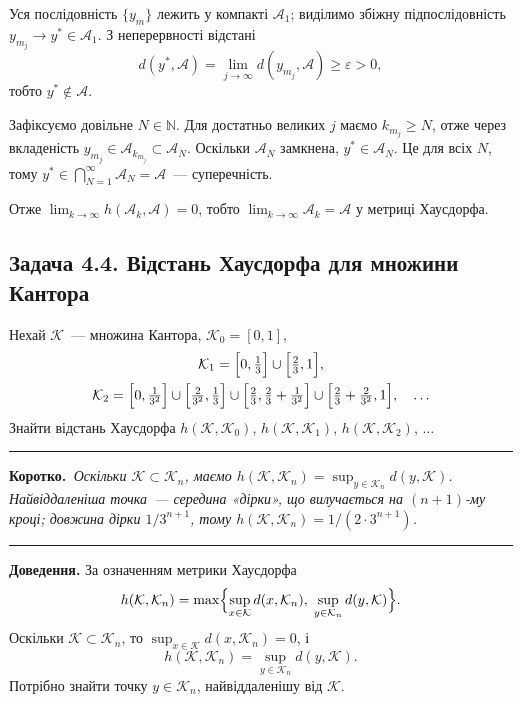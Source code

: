\documentclass[12pt,a4paper]{article}
\newenvironment{korotko}
  {\par\medskip\noindent\begingroup\color{accent!75!black}\rule{\linewidth}{0.4pt}\par
   \noindent\textbf{Коротко.}\itshape\,}
  {\par\noindent\rule{\linewidth}{0.4pt}\endgroup\medskip}
\begin{document}
Уся послідовність $\{y_m\}$ лежить у компакті $\mathcal{A}_1$; виділимо збіжну
підпослідовність $y_{m_j}\to y^*\in\mathcal{A}_1$. З неперервності відстані
\begin{equation*}
  d(y^*,\mathcal{A})=\lim_{j\to\infty}d(y_{m_j},\mathcal{A})\ge\varepsilon>0,
\end{equation*}
тобто $y^*\notin\mathcal{A}$.

Зафіксуємо довільне $N\in\mathbb{N}$. Для достатньо великих $j$ маємо $k_{m_j}\ge N$,
отже через вкладеність $y_{m_j}\in\mathcal{A}_{k_{m_j}}\subset\mathcal{A}_N$.
Оскільки $\mathcal{A}_N$ замкнена, $y^*\in\mathcal{A}_N$. Це для всіх $N$, тому
$y^*\in\bigcap_{N=1}^{\infty}\mathcal{A}_N=\mathcal{A}$~--- суперечність.

Отже $\lim_{k\to\infty}h(\mathcal{A}_k,\mathcal{A})=0$, тобто
$\lim_{k\to\infty}\mathcal{A}_k=\mathcal{A}$ у метриці Хаусдорфа.

\subsection{Задача 4.4. Відстань Хаусдорфа для множини Кантора}
Нехай $\mathcal{K}$~--- множина Кантора, $\mathcal{K}_0=[0,1]$,
\begin{gather*}
  \mathcal{K}_1=\Bigl[0,\tfrac13\Bigr]\cup\Bigl[\tfrac23,1\Bigr],\\
  \mathcal{K}_2=\Bigl[0,\tfrac{1}{3^2}\Bigr]\cup\Bigl[\tfrac{2}{3^2},\tfrac13\Bigr]
  \cup\Bigl[\tfrac23,\tfrac23+\tfrac{1}{3^2}\Bigr]
  \cup\Bigl[\tfrac23+\tfrac{2}{3^2},1\Bigr],\quad\ldots
\end{gather*}
Знайти відстань Хаусдорфа
$h(\mathcal{K},\mathcal{K}_0)$, $h(\mathcal{K},\mathcal{K}_1)$,
$h(\mathcal{K},\mathcal{K}_2)$, $\ldots$

\begin{korotko}
Оскільки $\mathcal{K}\subset\mathcal{K}_n$, маємо
$h(\mathcal{K},\mathcal{K}_n)=\sup_{y\in\mathcal{K}_n}d(y,\mathcal{K})$.
Найвіддаленіша точка~--- середина «дірки», що вилучається на $(n{+}1)$-му кроці;
довжина дірки $1/3^{n+1}$, тому $h(\mathcal{K},\mathcal{K}_n)=1/(2\cdot3^{n+1})$.
\end{korotko}

\noindent\textbf{Доведення.}
За означенням метрики Хаусдорфа
\begin{equation*}
  h(\mathcal{K},\mathcal{K}_n)
  =\max\Bigl\{\sup_{x\in\mathcal{K}}d(x,\mathcal{K}_n),\;
  \sup_{y\in\mathcal{K}_n}d(y,\mathcal{K})\Bigr\}.
\end{equation*}
Оскільки $\mathcal{K}\subset\mathcal{K}_n$, то $\sup_{x\in\mathcal{K}}d(x,\mathcal{K}_n)=0$, і
\begin{equation*}
  h(\mathcal{K},\mathcal{K}_n)=\sup_{y\in\mathcal{K}_n}d(y,\mathcal{K}).
\end{equation*}
Потрібно знайти точку $y\in\mathcal{K}_n$, найвіддаленішу від $\mathcal{K}$.
\end{document}

